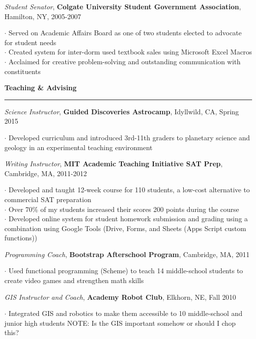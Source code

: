 \documentclass[11pt]{article}
\begin{document}
\emph{Student Senator}, \textbf{Colgate University Student Government Association}, Hamilton, NY, 2005-2007  \\
\begin{small}$\cdot$ {Served on Academic Affairs Board as one of two students elected to advocate for student needs }\\
$\cdot$ {Created system for inter-dorm used textbook sales using Microsoft Excel Macros }\\
$\cdot$ {Acclaimed for creative problem-solving and outstanding communication with constituents }\end{small}

\vspace*{0.25 mm}
\textbf{Teaching \& Advising}
\smallskip
\hrule
\emph{Science Instructor}, \textbf{Guided Discoveries Astrocamp}, Idyllwild, CA, Spring 2015\\
\begin{small}$\cdot$ {Developed curriculum and introduced 3rd-11th graders to planetary science and geology in an experimental teaching environment}\end{small}

\emph{Writing Instructor}, \textbf{MIT Academic Teaching Initiative SAT Prep}, Cambridge, MA, 2011-2012\\
\begin{small}$\cdot$ {Developed and taught 12-week course for 110 students, a low-cost alternative to commercial SAT preparation}\\
$\cdot$ {Over 70\% of my students increased their scores 200 points during the course}\\
$\cdot$ {Developed online system for student homework submission and grading using a combination using Google Tools (Drive, Forms, and Sheets (Apps Script custom functions))}\end{small}

\emph{Programming Coach}, \textbf{Bootstrap Afterschool Program}, Cambridge, MA, 2011\\
\begin{small}$\cdot$ {Used functional programming (Scheme) to teach 14 middle-school students to create video games and strengthen math skills}\end{small}

\emph{GIS Instructor and Coach}, \textbf{Academy Robot Club}, Elkhorn, NE, Fall 2010\\
\begin{small}$\cdot$ {Integrated GIS and robotics to make them accessible to 10 middle-school and junior high students NOTE: Is the GIS important somehow or should I chop this?}\end{small}
\end{document}

